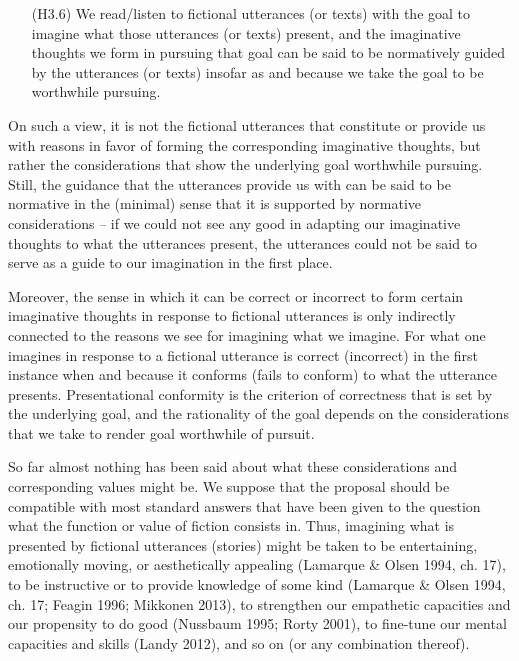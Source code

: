 \vspace{-.1cm}
\begin{itemize}[leftmargin=2cm]
\item[(H3.6)] We read/listen to fictional utterances (or texts) with the goal to imagine what those utterances (or texts) present, and the imaginative thoughts we form in pursuing that goal can be said to be normatively guided by the utterances (or texts) insofar as and because we take the goal to be worthwhile pursuing.
\end{itemize}
\vspace{-.1cm}

\noindent On such a view, it is not the fictional utterances that constitute or provide us with reasons in favor of forming the corresponding imaginative thoughts, but rather the considerations that show the underlying goal worthwhile pursuing. Still, the guidance that the utterances provide us with can be said to be normative in the (minimal) sense that it is supported by normative considerations -- if we could not see any good in adapting our imaginative thoughts to what the utterances present, the utterances could not be said to serve as a guide to our imagination in the first place.

Moreover, the sense in which it can be correct or incorrect to form certain imaginative thoughts in response to fictional utterances is only indirectly connected to the reasons we see for imagining what we imagine. For what one imagines in response to a fictional utterance is correct (incorrect) in the first instance when and because it conforms (fails to conform) to what the utterance presents. Presentational conformity is the criterion of correctness that is set by the underlying goal, and the rationality of the goal depends on the considerations that we take to render goal worthwhile of pursuit.

So far almost nothing has been said about what these considerations and corresponding values might be. We suppose that the proposal should be compatible with most standard answers that have been given to the question what the function or value of fiction consists in. Thus, imagining what is presented by fictional utterances (stories) might be taken to be entertaining, emotionally moving, or aesthetically appealing (Lamarque \& Olsen 1994, ch. 17), to be instructive or to provide knowledge of some kind (Lamarque \& Olsen 1994, ch. 17; Feagin 1996; Mikkonen 2013), to strengthen our empathetic capacities and our propensity to do good (Nussbaum 1995; Rorty 2001), to fine-tune our mental capacities and skills (Landy 2012), and so on (or any combination thereof).

